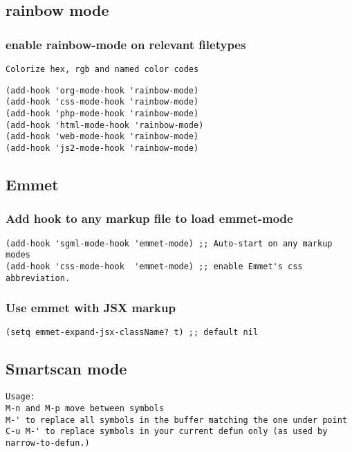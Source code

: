 \documentclass[11pt]{article}
\begin{document}
\subsection*{rainbow mode}
\label{sec:org6ebc8a4}
\subsubsection*{enable rainbow-mode on relevant filetypes}
\label{sec:org929656c}

\begin{verbatim}
Colorize hex, rgb and named color codes
\end{verbatim}


\begin{verbatim}
(add-hook 'org-mode-hook 'rainbow-mode)
(add-hook 'css-mode-hook 'rainbow-mode)
(add-hook 'php-mode-hook 'rainbow-mode)
(add-hook 'html-mode-hook 'rainbow-mode)
(add-hook 'web-mode-hook 'rainbow-mode)
(add-hook 'js2-mode-hook 'rainbow-mode)
\end{verbatim}

\subsection*{Emmet}
\label{sec:orge13a207}

\subsubsection*{Add hook to any markup file to load emmet-mode}
\label{sec:org8bcf0e6}
\begin{verbatim}
(add-hook 'sgml-mode-hook 'emmet-mode) ;; Auto-start on any markup modes
(add-hook 'css-mode-hook  'emmet-mode) ;; enable Emmet's css abbreviation. 
\end{verbatim}

\subsubsection*{Use emmet with JSX markup}
\label{sec:orgbc50cab}
\begin{verbatim}
(setq emmet-expand-jsx-className? t) ;; default nil
\end{verbatim}

\subsection*{Smartscan mode}
\label{sec:orgb17194b}
\begin{verbatim}
Usage:
M-n and M-p move between symbols
M-' to replace all symbols in the buffer matching the one under point
C-u M-' to replace symbols in your current defun only (as used by narrow-to-defun.)
\end{verbatim}
\end{document}
